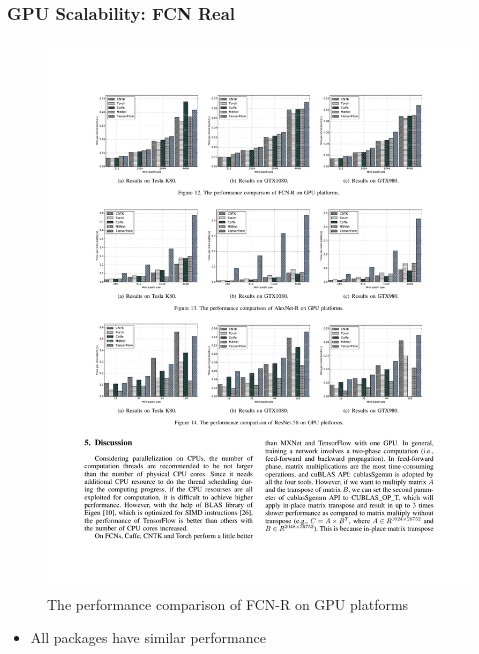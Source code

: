 \begin{frame}
	\MyLogo
	\frametitle{GPU Scalability: FCN Real}
	
	\begin{figure}[htbp] 
		\includegraphics[width=\linewidth]{figures/FCN-R2.pdf} 
		\caption{The performance comparison of FCN-R on GPU platforms}
	\end{figure}

\vskip -10pt
\begin{mdframed}[style=mystyle1]
\begin{itemize}
\item All packages have similar performance
\end{itemize}
\end{mdframed}

\end{frame}


